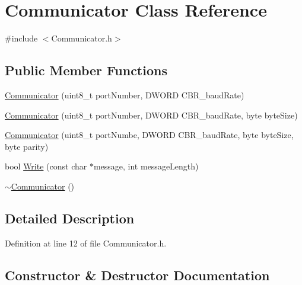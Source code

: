 \hypertarget{class_communicator}{}\section{Communicator Class Reference}
\label{class_communicator}


{\ttfamily \#include $<$Communicator.\+h$>$}

\subsection*{Public Member Functions}
\begin{DoxyCompactItemize}
\item 
\mbox{\hyperlink{class_communicator_aacc43c8cc9fc1d2d6d8f55f18f3a6a69}{Communicator}} (uint8\+\_\+t port\+Number, D\+W\+O\+RD C\+B\+R\+\_\+baud\+Rate)
\item 
\mbox{\hyperlink{class_communicator_ac3274a4f40c669f4db2e7fe4f239d018}{Communicator}} (uint8\+\_\+t port\+Number, D\+W\+O\+RD C\+B\+R\+\_\+baud\+Rate, byte byte\+Size)
\item 
\mbox{\hyperlink{class_communicator_a86b21e90bb3c1c8afedcc2c1e523c79c}{Communicator}} (uint8\+\_\+t port\+Numbe, D\+W\+O\+RD C\+B\+R\+\_\+baud\+Rate, byte byte\+Size, byte parity)
\item 
bool \mbox{\hyperlink{class_communicator_adfc4f5c9dc389520bcd6d49214564b06}{Write}} (const char $\ast$message, int message\+Length)
\item 
\mbox{\hyperlink{class_communicator_a4ced5362bf7438924f8d7f1b0c5ec391}{$\sim$\+Communicator}} ()
\end{DoxyCompactItemize}


\subsection{Detailed Description}


Definition at line 12 of file Communicator.\+h.



\subsection{Constructor \& Destructor Documentation}
\mbox{\label{class_communicator_aacc43c8cc9fc1d2d6d8f55f18f3a6a69}} 
